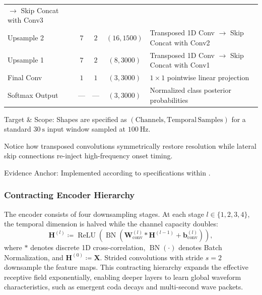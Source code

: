 \begin{table}[htbp]
\begin{threeparttable}
\begin{tabularx}{\linewidth}{l c c c X}
      $\to$ Skip Concat with Conv3 \\
      Upsample 2 & $7$ & $2$ & $(16, \num{1500})$ & Transposed 1D Conv
      $\to$ Skip Concat with Conv2 \\
      Upsample 1 & $7$ & $2$ & $(8, \num{3000})$ & Transposed 1D Conv
      $\to$ Skip Concat with Conv1 \\
      Final Conv & $1$ & $1$ & $(3, \num{3000})$ & $1 \times 1$ pointwise
      linear projection \\
      Softmax Output & --- & --- & $(3, \num{3000})$ & Normalized class
      posterior probabilities \\
      \bottomrule
    \end{tabularx}
    \begin{tablenotes}[flushleft]
      \footnotesize
    \item[a] Target \& Scope: Shapes are specified as
      $(\mathrm{Channels}, \mathrm{Temporal\,Samples})$ for a
      standard $\qty{30}{\second}$ input window sampled at $\qty{100}{\hertz}$.
    \item Notice how transposed convolutions symmetrically restore
      resolution while lateral skip connections re-inject
      high-frequency onset timing.
    \item Evidence Anchor: Implemented according to \textcite{PhaseNet}
      specifications within .
    \end{tablenotes}
  \end{threeparttable}
\end{table}

\subsubsection{Contracting Encoder Hierarchy}
The encoder consists of four downsampling stages. At each stage $l
\in \{1, 2, 3, 4\}$, the temporal dimension is halved while the
channel capacity doubles:
\begin{equation}
  \mathbf{H}^{(l)} \coloneqq \operatorname{ReLU}\left( \operatorname{BN}\left(
      \mathbf{W}_{\mathrm{conv}}^{(l)} * \mathbf{H}^{(l - 1)} +
  \mathbf{b}_{\mathrm{conv}}^{(l)} \right) \right),
\end{equation}
where $*$ denotes discrete 1D cross-correlation,
$\operatorname{BN}( \cdot )$ denotes Batch Normalization, and
$\mathbf{H}^{(0)} \coloneqq \mathbf{X}$. Strided convolutions with stride
$s = 2$ downsample the feature maps. This contracting hierarchy
expands the effective receptive field exponentially, enabling deeper
layers to learn global waveform characteristics, such as emergent
coda decays and multi-second wave packets.

